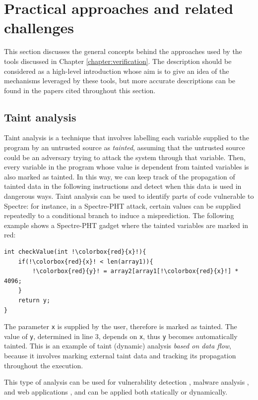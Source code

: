\documentclass[12pt,a4paper]{book}
\theoremstyle{definition}
\begin{document}
	\section{Practical approaches and related challenges}
	This section discusses the general concepts behind the approaches used by the tools discussed in Chapter \ref{chapter:verification}. The description should be considered as a high-level introduction whose aim is to give an idea of the mechanisms leveraged by these tools, but more accurate descriptions can be found in the papers cited throughout this section.
	\subsection{Taint analysis}\label{sec:taint}
	Taint analysis is a technique that involves labelling each variable supplied to the program by an untrusted source as \textit{tainted}, assuming that the untrusted source could be an adversary trying to attack the system  through that variable.
	Then, every variable in the program whose value is dependent from tainted variables is also marked as tainted. In this way, we can keep track of the propagation of tainted data in the following instructions and detect when this data is used in dangerous ways. Taint analysis can be used to identify parts of code vulnerable to Spectre: for instance, in a Spectre-PHT attack, certain values can be supplied repeatedly to a conditional branch to induce a misprediction. The following example shows a Spectre-PHT gadget where the tainted variables are marked in red:
	
	\begin{lstlisting}[escapechar=!]
int checkValue(int !\colorbox{red}{x}!){
	if(!\colorbox{red}{x}! < len(array1)){
		!\colorbox{red}{y}! = array2[array1[!\colorbox{red}{x}!] * 4096;
	}
	return y;
}
	\end{lstlisting}
	The parameter \texttt{x} is supplied by the user, therefore is marked as tainted. The value of \texttt{y}, determined in line 3, depends on \texttt{x}, thus \texttt{y} becomes automatically tainted. This is an example of taint (dynamic) analysis \textit{based on data flow}, because it involves marking external taint data and tracking its propagation throughout the execution.
	
	This type of analysis can be used for vulnerability detection \cite{Newsome2005}, malware analysis \cite{Bayer2009} \cite{Yin2007}, and web applications \cite{Balzarotti2008} \cite{NguyenTuong2005}, and can be applied both statically or dynamically.
	
\end{document}
